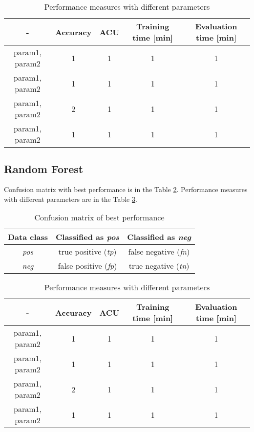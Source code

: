 \documentclass[11pt,a4paper,titlepage]{article}
\begin{document}
  \begin{table}
  \centering
  \begin{tabular}{| c | c | c | c | c |}
    \hline
     		-	   & Accuracy & 	ACU 	& Training time [min] & Evaluation time [min] \\ \hline
    param1, param2 &  1 	  &     1		& 		1			  & 		1 		\\ \hline
    param1, param2 & 	1	  & 	1 		& 		1			  &			1 		\\ \hline
    param1, param2 & 	2	  & 	1		& 		1			  &			1		\\ \hline
    param1, param2 &  1       & 	1		& 		1			  &			1			\\
    \hline
  \end{tabular}
  \caption{Performance measures with different parameters}
  \label{table:DTKDD}
  \end{table}

\subsection{Random Forest}
Confusion matrix with best performance is in the Table \ref{table:confusionMatrixRFKDD}. Performance measures with different parameters are in the Table \ref{table:RFKDD}.
\begin{table}
  \centering
  \begin{tabular}{| c | c | c |}
    \hline
    Data class & Classified as \textit{pos} & Classified as \textit{neg} \\ \hline
    \textit{pos} & true positive (\textit{tp}) & false negative (\textit{fn}) \\ \hline
    \textit{neg} & false positive (\textit{fp}) & true negative (\textit{tn}) \\
    \hline
  \end{tabular}
  \caption{Confusion matrix of best performance}
  \label{table:confusionMatrixRFKDD}
  \end{table}
  
  \begin{table}
  \centering
  \begin{tabular}{| c | c | c | c | c |}
    \hline
     		-	   & Accuracy & 	ACU 	& Training time [min] & Evaluation time [min] \\ \hline
    param1, param2 &  1 	  &     1		& 		1			  & 		1 		\\ \hline
    param1, param2 & 	1	  & 	1 		& 		1			  &			1 		\\ \hline
    param1, param2 & 	2	  & 	1		& 		1			  &			1		\\ \hline
    param1, param2 &  1       & 	1		& 		1			  &			1			\\
    \hline
  \end{tabular}
  \caption{Performance measures with different parameters}
  \label{table:RFKDD}
  \end{table}
\end{document}

